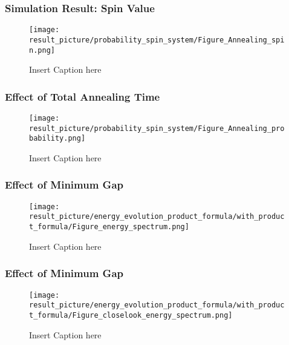 \documentclass{beamer}
\begin{document}
\begin{frame}
	\frametitle{Simulation Result: Spin Value}
	\begin{figure}
		\centering
		\texttt{[image: result\_picture/probability\_spin\_system/Figure\_Annealing\_spin.png]}
		\caption{Insert Caption here}
	\end{figure}
\end{frame}

\begin{frame}
	\frametitle{Effect of Total Annealing Time}
	\begin{figure}
		\centering
		\texttt{[image: result\_picture/probability\_spin\_system/Figure\_Annealing\_probability.png]}
		
		\caption{Insert Caption here}
	\end{figure}
\end{frame}

\begin{frame}
	\frametitle{Effect of Minimum Gap}
	\begin{figure}
		\centering
		\texttt{[image: result\_picture/energy\_evolution\_product\_formula/with\_product\_formula/Figure\_energy\_spectrum.png]}
		
		\caption{Insert Caption here}
	\end{figure}
\end{frame}

\begin{frame}
	\frametitle{Effect of Minimum Gap}
	\begin{figure}
		\centering
		\texttt{[image: result\_picture/energy\_evolution\_product\_formula/with\_product\_formula/Figure\_closelook\_energy\_spectrum.png]}
		
		\caption{Insert Caption here}
	\end{figure}
\end{frame}
\end{document}
